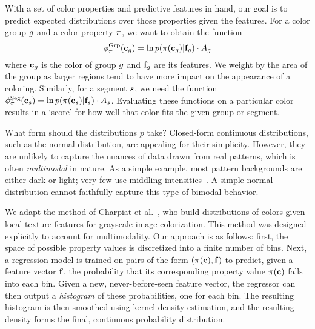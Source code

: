 With a set of color properties and predictive features in hand, our goal is to predict expected distributions over those properties given the features. For a color group $g$ and a color property $\pi$, we want to obtain the function
\begin{equation*}
\phi^{\textrm{Grp}}_\pi(\mathbf{c}_g) =  \ln p( \pi( \mathbf{c}_g ) | \mathbf{f}_g ) \cdot A_g
\end{equation*}
where $\mathbf{c}_g$ is the color of group $g$ and $\mathbf{f}_g$ are its features. We weight by the area of the group as larger regions tend to have more impact on the appearance of a coloring. Similarly, for a segment $s$, we need the function $\phi^{\textrm{Seg}}_\pi(\mathbf{c}_s) = \ln p( \pi( \mathbf{c}_s ) | \mathbf{f}_s) \cdot A_s$. Evaluating these functions on a particular color results in a `score' for how well that color fits the given group or segment.


What form should the distributions $p$ take? Closed-form continuous distributions, such as the normal distribution, are appealing for their simplicity.  However, they are unlikely to capture the nuances of data drawn from real patterns, which is often \emph{multimodal} in nature. As a simple example, most pattern backgrounds are either dark or light; very few use middling intensities~. A simple normal distribution cannot faithfully capture this type of bimodal behavior.

We adapt the method of Charpiat et al.~, who build distributions of colors given local texture features for grayscale image colorization. This method was designed explicitly to account for multimodality. Our approach is as follows: first, the space of possible property values is discretized into a finite number of bins. Next, a regression model is trained on pairs of the form $(\pi(\mathbf{c}), \mathbf{f})$ to predict, given a feature vector $\mathbf{f}$, the probability that its corresponding property value $\pi(\mathbf{c})$ falls into each bin. Given a new, never-before-seen feature vector, the regressor can then output a \emph{histogram} of these probabilities, one for each bin. The resulting histogram is then smoothed using kernel density estimation, and the resulting density forms the final, continuous probability distribution.

